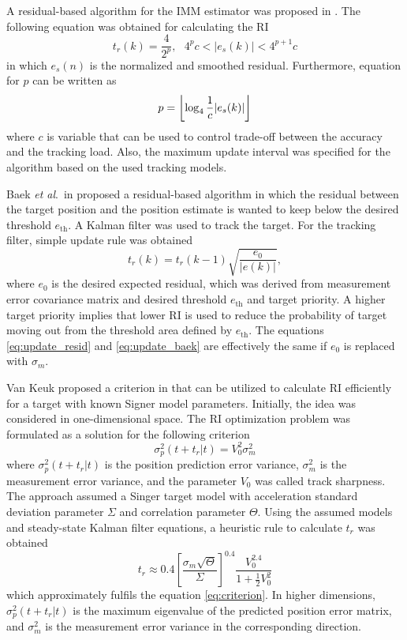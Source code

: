 \documentclass[english, 12pt, a4paper, elec, utf8, a-1b, online]{aaltothesis}
\newcommand{\etal}{\textit{et al}.~}
\DeclarePairedDelimiter\floor{\lfloor}{\rfloor}
\begin{document}
A residual-based algorithm for the IMM estimator was proposed in \cite{ChengTing2007}.
The following equation was obtained for calculating the RI
\begin{equation}
    t_r(k) = \frac{4}{2^p}, \text{ } 4^p c < |e_s(k)| < 4^{p+1}c
\end{equation}
in which $e_s(n)$ is the normalized and smoothed residual.
Furthermore, equation for $p$ can be written as
\begin{equation}
    p = \floor*{\log_4\frac{1}{c}|e_s(k)|}
\end{equation}
where $c$ is variable that can be used to control trade-off between the accuracy and the tracking load.
Also, the maximum update interval was specified for the algorithm based on the used tracking models.

Baek \etal in \cite{Baek2010} proposed a residual-based algorithm in which the residual between the target position and the position estimate is wanted to keep below the desired threshold $e_\text{th}$.
A Kalman filter was used to track the target.
For the tracking filter, simple update rule was obtained
\begin{equation}\label{eq:update_baek}
    t_r(k) = t_r(k - 1) \sqrt{\frac{e_0}{|e(k)|}},
\end{equation}
where $e_0$ is the desired expected residual, which was derived from measurement error covariance matrix and desired threshold $e_\text{th}$ and target priority.
A higher target priority implies that lower RI is used to reduce the probability of target moving out from the threshold area defined by $e_\text{th}$.
The equations \eqref{eq:update_resid} and \eqref{eq:update_baek} are effectively the same if $e_0$ is replaced with $\sigma_m$.


Van Keuk proposed a criterion in \cite{Keuk1975} that can be utilized to calculate RI efficiently for a target with known Signer model parameters.
Initially, the idea was considered in one-dimensional space.
The RI optimization problem was formulated as a solution for the following criterion
\begin{equation} \label{eq:criterion}
    \sigma_p^2(t + t_r | t) = V_0^2 \sigma_m^2
\end{equation}
where $\sigma_p^2(t + t_r | t)$ is the position prediction error variance, $\sigma_m^2$ is the measurement error variance, and
the parameter $V_0$ was called track sharpness.
The approach assumed a Singer target model with acceleration standard deviation parameter $\Sigma$ and correlation parameter $\Theta$.
Using the assumed models and steady-state Kalman filter equations, a heuristic rule to calculate $t_r$ was obtained
\begin{equation}\label{eq:keuk_time}
    t_r \approx 0.4 \left[ \frac{\sigma_m \sqrt{\Theta}}{\Sigma} \right]^{0.4} \frac{V_0^{2.4}}{1+\frac{1}{2}V_0^2}
\end{equation}
which approximately fulfils the equation \eqref{eq:criterion}.
In higher dimensions, $\sigma_p^2(t + t_r | t)$ is the maximum eigenvalue of the predicted position error matrix, and $\sigma_m^2$ is the measurement error variance in the corresponding direction.
\end{document}
